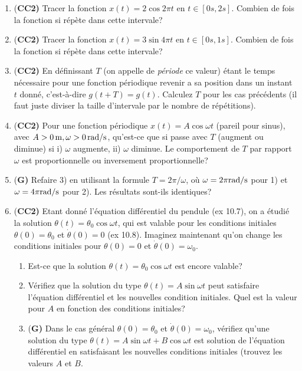 \documentclass[french,12pt]{article}
\begin{document}
\begin{enumerate}
\item {(\bf CC2)} Tracer la fonction $x(t) = 2 \cos 2\pi t$ en $t\in[0 s, 2 s]$. Combien de fois la fonction si répète dans cette intervale? 
\item {(\bf CC2)} Tracer la fonction $x(t) = 3 \sin 4\pi t$ en $t\in[0 s, 1 s]$. Combien de fois la fonction si répète dans cette intervale? 
\item {(\bf CC2)} En définissant $T$ (on appelle de \textit{période} ce valeur) étant le temps nécessaire pour une fonction périodique  revenir a sa position dans un instant $t$ donné, c'est-à-dire $g(t + T) = g(t)$. Calculez $T$ pour les cas précédents (il faut juste diviser la taille d'intervale par le nombre de répétitions).
\item {(\bf CC2)} Pour une fonction périodique $x(t) = A \cos \omega t$ (pareil pour sinus), avec $A>0 {\rm \, m}, \omega > 0 {\rm \, rad/s}$, qu'est-ce que si passe avec $T$ (augment ou diminue) si i) $\omega$ augmente, ii) $\omega$ diminue. Le comportement de $T$ par rapport $\omega$ est proportionnelle ou inversement proportionnelle? 
\item {(\bf G)} Refaire 3) en utilisant la formule $T = 2\pi/\omega$, où $\omega = 2 \pi {\rm rad/s}$ pour 1) et $\omega = 4 \pi {\rm rad/s}$ pour 2). Les résultats sont-ils identiques?
\item {(\bf CC2)} Etant donné l'équation différentiel du pendule (ex 10.7), on a étudié la solution $\theta(t) = \theta_0 \cos \omega t$, qui est valable pour les conditions initiales $\theta(0) = \theta_0$ et $\dot{\theta}(0) = 0$ (ex 10.8). Imaginez maintenant qu'on change les conditions initiales pour $\theta(0) = 0$ et $\dot{\theta}(0) = \omega_0$.
\begin{enumerate}
\item Est-ce que la solution $\theta(t) = \theta_0 \cos \omega t$ est encore valable?
\item Vérifiez que la solution du type $\theta(t) = A \sin \omega t$ peut satisfaire l'équation différentiel et les nouvelles condition initiales. Quel est la valeur pour $A$ en fonction des conditions initiales? 
\item {(\bf G)} Dans le cas général $\theta(0) = \theta_0$ et $\dot{\theta}(0) = \omega_0$, vérifiez qu'une solution du type $\theta(t) = A \sin \omega t + B \cos \omega t$ est solution de l'équation différentiel en satisfaisant les nouvelles conditions initiales (trouvez les valeurs $A$ et $B$. 


\end{enumerate}
\end{enumerate}
\end{document}
